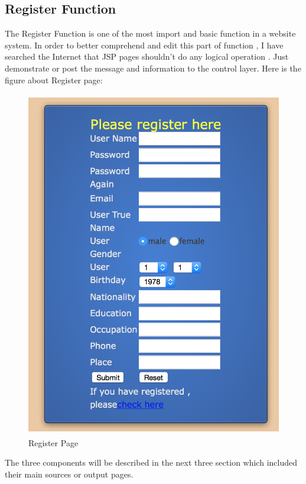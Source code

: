 \documentclass[12pt]{article}
\begin{document}
\subsection{Register Function}
The Register Function is one of the most import and basic function in a website system. In order to better comprehend and edit this part of function , I have searched the Internet that JSP pages shouldn't do any logical operation . Just demonstrate or post the message and information to the control layer. Here is the figure about Register page:
\begin{figure}[H]
	\centering
		\includegraphics[height=6in]{images/RegisterPage.jpg}

		\caption[Register Page]{Register Page}
	\label{fig:Register Page}
\end{figure}
	 The three components will be described in the next three section which included their main sources or output pages.
\cleardoublepage
	
\end{document}
